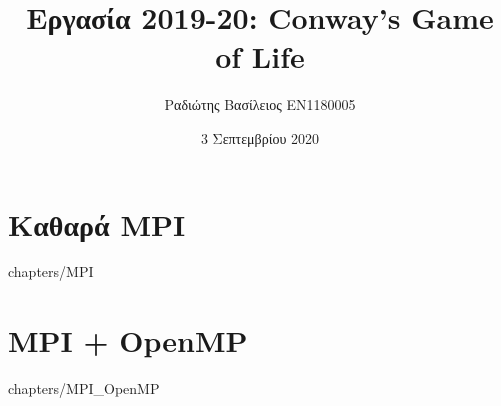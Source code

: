 \documentclass[12pt]{report}
\title {Εργασία 2019-20: Conway’s Game of Life}
\author {Ραδιώτης Βασίλειος EN1180005}
\date {3 Σεπτεμβρίου 2020}
\begin{document}
\maketitle

\tableofcontents

\chapter {Καθαρά MPI}
   {chapters/MPI}

\chapter {MPI + OpenMP}
   {chapters/MPI_OpenMP}
\end{document}

